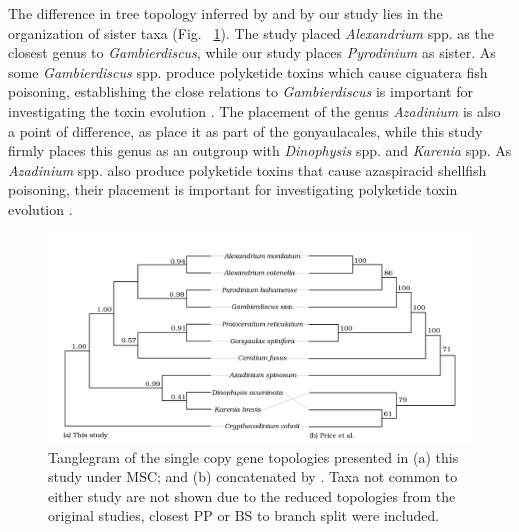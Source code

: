 \documentclass[fleqn,10pt,lineno]{wlpeerj} %
\begin{document}
The difference in tree topology inferred by \cite{price2017robust} and by our study lies in the organization of sister taxa (Fig. ~\ref{fig:tanglePrice}). 
The \cite{price2017robust} study placed \emph{Alexandrium} spp. as the closest genus to \emph{Gambierdiscus}, while our study places \emph{Pyrodinium} as sister. 
As some \emph{Gambierdiscus} spp. produce polyketide toxins which cause ciguatera fish poisoning, establishing the close relations to \emph{Gambierdiscus} is important for investigating the toxin evolution \citep{pawlowiez2014transcriptome}.
The placement of the genus \emph{Azadinium} is also a point of difference, as \cite{price2017robust} place it as part of the gonyaulacales, while this study firmly places this genus as an outgroup with \emph{Dinophysis} spp. and \emph{Karenia} spp.
As \emph{Azadinium} spp. also produce polyketide toxins that cause azaspiracid shellfish poisoning, their placement is important for investigating polyketide toxin evolution \citep{meyer2015transcriptomic}.
 
\begin{figure}[ht]
\centering
\includegraphics[width=\linewidth]{gonya-figs/Price-comparison.png}
\caption{Tanglegram of the single copy gene topologies presented in (a) this study under MSC; and (b) concatenated by \cite{price2017robust}. Taxa not common to either study are not shown due to the reduced topologies from the original studies, closest PP or BS to branch split were included.} 
\label{fig:tanglePrice}
\end{figure} 
\end{document}
